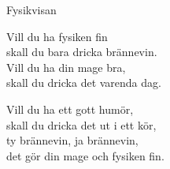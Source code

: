 \begin{song}{Fysikvisan}
	
	Vill du ha fysiken fin\\
	skall du bara dricka brännevin.\\
	Vill du ha din mage bra,\\
	skall du dricka det varenda dag.
	
	Vill du ha ett gott humör,\\
	skall du dricka det ut i ett kör,\\
	ty brännevin, ja brännevin,\\
	det gör din mage och fysiken fin.
	
\end{song}
